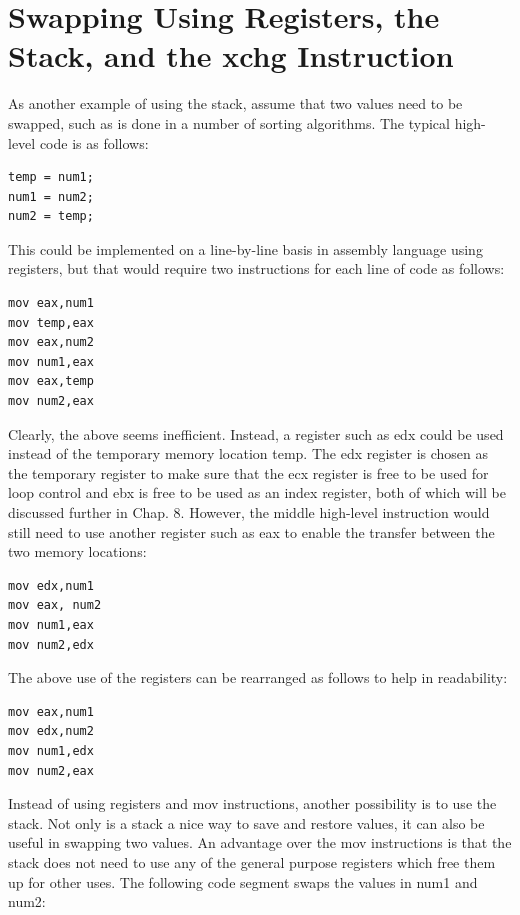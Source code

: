 \documentclass[10pt]{book}
\begin{document}
\section{Swapping Using Registers, the Stack, and the xchg Instruction}
As another example of using the stack, assume that two values need to be swapped, such as is done in a number of sorting algorithms. The typical high-level code is as follows:

\begin{verbatim}
temp = num1;
num1 = num2;
num2 = temp;
\end{verbatim}

This could be implemented on a line-by-line basis in assembly language using registers, but that would require two instructions for each line of code as follows:

\begin{verbatim}
mov eax,num1
mov temp,eax
mov eax,num2
mov num1,eax
mov eax,temp
mov num2,eax
\end{verbatim}

Clearly, the above seems inefficient. Instead, a register such as edx could be used instead of the temporary memory location temp. The edx register is chosen as the temporary register to make sure that the ecx register is free to be used for loop control and ebx is free to be used as an index register, both of which will be discussed further in Chap. 8. However, the middle high-level instruction would still need to use another register such as eax to enable the transfer between the two memory locations:
\begin{verbatim}
mov edx,num1
mov eax, num2
mov num1,eax
mov num2,edx
\end{verbatim}

The above use of the registers can be rearranged as follows to help in readability:

\begin{verbatim}
mov eax,num1
mov edx,num2
mov num1,edx
mov num2,eax
\end{verbatim}

Instead of using registers and mov instructions, another possibility is to use the stack. Not only is a stack a nice way to save and restore values, it can also be useful in swapping two values. An advantage over the mov instructions is that the stack does not need to use any of the general purpose registers which free them up for other uses. The following code segment swaps the values in num1 and num2:
\end{document}
